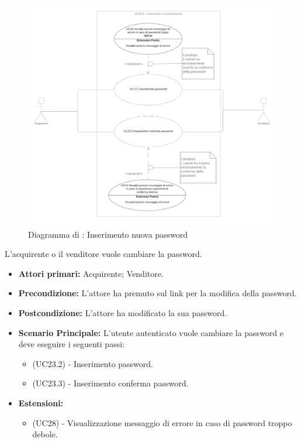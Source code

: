 \begin{figure}[H]
    \centering
    \includegraphics[width=\textwidth]{Immagini/DiagrammiUC/UC15.1InserimentoNuovaPassword}
    \caption{Diagramma di \actualUC: Inserimento nuova password} 
    \label{fig:VisualizzazioneProdottiNelCarrello}
\end{figure}

L'acquirente o il venditore vuole cambiare la password.
\begin{itemize}
    \item \textbf{Attori primari:} Acquirente; Venditore.
    \item \textbf{Precondizione:} L'attore ha premuto sul link per la modifica della password.
    \item \textbf{Postcondizione:} L'attore ha modificato la sua password.
    \item \textbf{Scenario Principale:} L'utente autenticato vuole cambiare la password e deve eseguire i seguenti passi:
    \begin{itemize}
        \item (UC23.2) - Inserimento password.
        \item (UC23.3) - Inserimento conferma password.
    \end{itemize}
    \item \textbf{Estensioni:}
    \begin{itemize}
        \item (UC28) - Visualizzazione messaggio di errore in caso di password troppo debole.
    \end{itemize}
\end{itemize}

